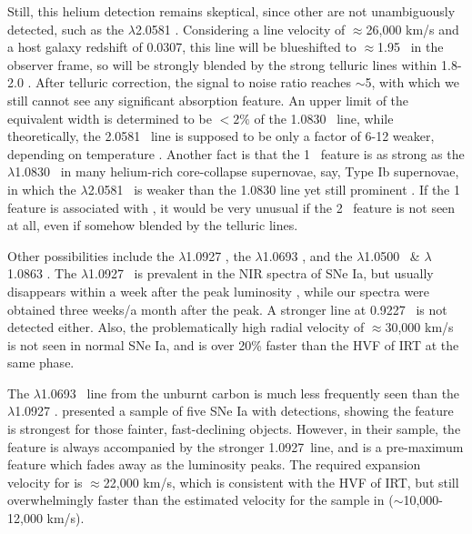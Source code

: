 \documentclass[twocolumn]{aastex631}
\begin{document}
Still, this helium detection remains skeptical, since other  are not unambiguously detected, such as the  $\lambda$2.0581 \micron. Considering a line velocity of $\approx$26,000 km/s and a host galaxy redshift of 0.0307, this line will be blueshifted to $\approx$1.95 \micron\ in the observer frame, so will be strongly blended by the strong telluric lines within 1.8-2.0 \micron. After telluric correction, the signal to noise ratio reaches $\sim$5, with which we still cannot see any significant absorption feature. An upper limit of the equivalent width is determined to be $<2\%$ of the 1.0830 \micron\ line, while theoretically, the 2.0581 \micron\ line is supposed to be only a factor of 6-12 weaker, depending on temperature \citep{Marion2009_NIR}. Another fact is that the 1 \micron\ feature is as strong as the  $\lambda$1.0830 \micron\ in many helium-rich core-collapse supernovae, say, Type Ib supernovae, in which the  $\lambda$2.0581 \micron\ is weaker than the 1.0830 \micron line yet still prominent \citep{CSP_Ibc_2022}. If the 1 \micron feature is associated with , it would be very unusual if the 2 \micron\ feature is not seen at all, even if somehow blended by the telluric lines. 

Other possibilities include the  $\lambda$1.0927 \micron, the  $\lambda$1.0693 \micron, and the  $\lambda$1.0500 \micron\ \& $\lambda$1.0863 \micron. The  $\lambda$1.0927 \micron\ is prevalent in the NIR spectra of SNe Ia, but usually disappears within a week after the peak luminosity \citep{Marion2009_NIR}, while our spectra were obtained three weeks/a month after the peak. A stronger  line at 0.9227 \micron\ is not detected either. Also, the problematically high radial velocity of $\approx$30,000 km/s is not seen in normal SNe Ia, and is over 20\% faster than the HVF of  IRT at the same phase.

The  $\lambda$1.0693 \micron\ line from the unburnt carbon is much less frequently seen than the  $\lambda$1.0927 \micron. \citet{hsiao_CSP_2019} presented a sample of five SNe Ia with  detections, showing the  feature is strongest for those fainter, fast-declining objects. However, in their sample, the  feature is always accompanied by the stronger  1.0927\micron\ line, and is a pre-maximum feature which fades away as the luminosity peaks. The required expansion velocity for  is $\approx$22,000 km/s, which is consistent with the HVF of  IRT, but still overwhelmingly faster than the estimated velocity for the sample in \citet{hsiao_CSP_2019} ($\sim$10,000-12,000 km/s).
\end{document}
